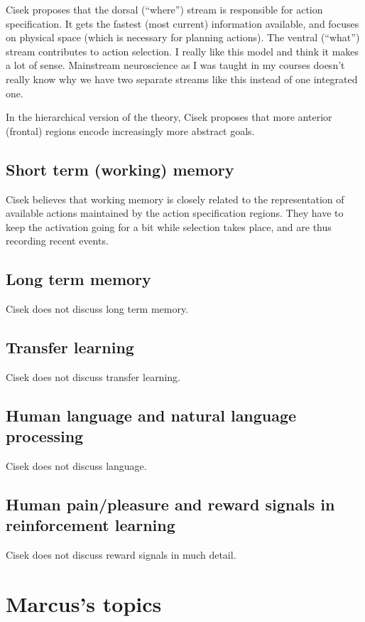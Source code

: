 \documentclass[10pt,a4paper]{article}
\newcommand{\nquote}[1]{``{#1}''}
\begin{document}
Cisek proposes that the dorsal (\nquote{where}) stream is responsible for action specification. It gets the fastest (most current) information available, and focuses on physical space (which is necessary for planning actions). The ventral (\nquote{what}) stream contributes to action selection. I really like this model and think it makes a lot of sense. Mainstream neuroscience as I was taught in my courses doesn't really know why we have two separate streams like this instead of one integrated one.

In the hierarchical version of the theory, Cisek proposes that more anterior (frontal) regions encode increasingly more abstract goals.

\subsection{Short term (working) memory}
Cisek believes that working memory is closely related to the representation of available actions maintained by the action specification regions. They have to keep the activation going for a bit while selection takes place, and are thus recording recent events.

\subsection{Long term memory}
Cisek does not discuss long term memory.

\subsection{Transfer learning}
Cisek does not discuss transfer learning.

\subsection{Human language and natural language processing}
Cisek does not discuss language.

\subsection{Human pain/pleasure and reward signals in reinforcement learning}
Cisek does not discuss reward signals in much detail.

\section{Marcus's topics}
\end{document}
